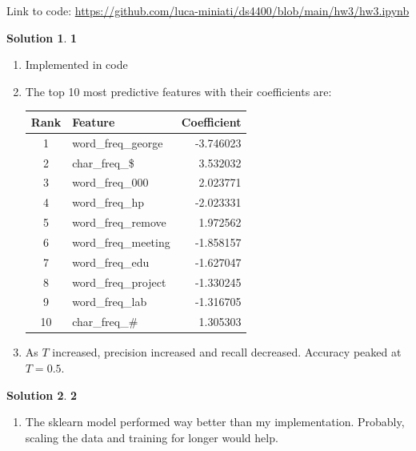 \documentclass[11pt]{article}
\theoremstyle{definition}
\theoremstyle{nopunct}
\newtheorem*{s}{Solution}
\begin{document}
Link to code: 
\href{https://github.com/luca-miniati/ds4400/blob/main/hw3/hw3.ipynb}
{https://github.com/luca-miniati/ds4400/blob/main/hw3/hw3.ipynb}

\begin{s}
\textbf{1}

\begin{enumerate}
  \item Implemented in code
  \item The top 10 most predictive features with their coefficients are:

    \begin{center}
      \begin{tabular}{|c|l|r|}
        \hline
        Rank & Feature & Coefficient \\
        \hline
        1 & word\_freq\_george  & -3.746023 \\
        2 & char\_freq\_\$      & 3.532032 \\
        3 & word\_freq\_000     & 2.023771 \\
        4 & word\_freq\_hp      & -2.023331 \\
        5 & word\_freq\_remove  & 1.972562 \\
        6 & word\_freq\_meeting & -1.858157 \\
        7 & word\_freq\_edu     & -1.627047 \\
        8 & word\_freq\_project & -1.330245 \\
        9 & word\_freq\_lab     & -1.316705 \\
        10 & char\_freq\_\#     & 1.305303 \\
        \hline
      \end{tabular}
    \end{center}

  \item As $T$ increased, precision increased and recall decreased. Accuracy
    peaked at $T = 0.5$.

\end{enumerate}

\end{s}

\vspace{10pt}

\begin{s}
  \textbf{2}

  \begin{enumerate}
  \item The sklearn model performed way better than my implementation. Probably,
    scaling the data and training for longer would help.

  \end{enumerate}

\end{s}
\end{document}
